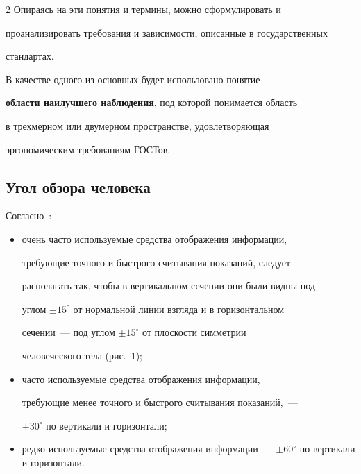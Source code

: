 \begin{multicols}{2}
     Опираясь на эти понятия и термины, можно сформулировать и 


проанализировать требования и зависимости, описанные в государственных 


стандартах.


     


     В качестве одного из основных будет использовано понятие 


\textbf{области наилучшего наблюдения}, под которой понимается область 


в трехмерном или двумерном пространстве, удовлетворяющая 


эргономическим требованиям ГОСТов.


    





\subsection{Угол обзора человека} %





Согласно~\cite{13chu, 14chu}:


\begin{itemize}


\item очень часто используемые средства отображения информации, 


требующие точного и быст\-ро\-го считывания показаний, следует 


располагать так, чтобы в вертикальном сечении они были видны под 


углом $\pm 15^\circ$ от нормальной линии взгляда и в горизонтальном 


сечении~--- под углом $\pm 15^\circ$ от плоскости симметрии 


человеческого тела (рис.~1);


\item часто используемые средства отображения информации, 


требующие менее точного и быстрого считывания показаний,~--- 


$\pm30^\circ$ по вертикали и горизонтали;


\item редко используемые средства отображения информации~--- $\pm 


60^\circ$ по вертикали и горизонтали.


\end{itemize}












\end{multicols}
